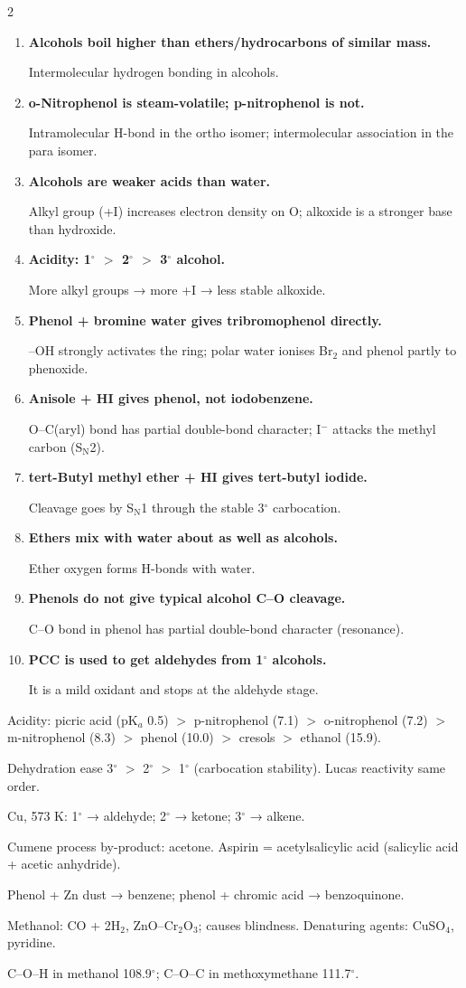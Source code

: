 \documentclass[10pt,a4paper]{extarticle}
\newenvironment{rqlist}{\begin{enumerate}[leftmargin=12pt,label={\sffamily\bfseries\scriptsize\color{uc}\arabic*.},itemsep=1pt]}{\end{enumerate}}
\newcommand{\ans}{\par\hspace*{2pt}{\color{uc}$\hookrightarrow$}\;}
\begin{document}
\begin{multicols}{2}
\begin{rqlist}
\item \textbf{Alcohols boil higher than ethers/hydrocarbons of similar mass.}\ans Intermolecular hydrogen bonding in alcohols.
\item \textbf{o-Nitrophenol is steam-volatile; p-nitrophenol is not.}\ans Intramolecular H-bond in the ortho isomer; intermolecular association in the para isomer.
\item \textbf{Alcohols are weaker acids than water.}\ans Alkyl group (+I) increases electron density on O; alkoxide is a stronger base than hydroxide.
\item \textbf{Acidity: 1$^\circ$ $>$ 2$^\circ$ $>$ 3$^\circ$ alcohol.}\ans More alkyl groups → more +I → less stable alkoxide.
\item \textbf{Phenol + bromine water gives tribromophenol directly.}\ans --OH strongly activates the ring; polar water ionises Br$_2$ and phenol partly to phenoxide.
\item \textbf{Anisole + HI gives phenol, not iodobenzene.}\ans O--C(aryl) bond has partial double-bond character; I$^-$ attacks the methyl carbon (S$_\text{N}$2).
\item \textbf{tert-Butyl methyl ether + HI gives tert-butyl iodide.}\ans Cleavage goes by S$_\text{N}$1 through the stable 3$^\circ$ carbocation.
\item \textbf{Ethers mix with water about as well as alcohols.}\ans Ether oxygen forms H-bonds with water.
\item \textbf{Phenols do not give typical alcohol C--O cleavage.}\ans C--O bond in phenol has partial double-bond character (resonance).
\item \textbf{PCC is used to get aldehydes from 1$^\circ$ alcohols.}\ans It is a mild oxidant and stops at the aldehyde stage.
\end{rqlist}

\begin{fl}
\item Acidity: picric acid (pK$_a$ 0.5) $>$ p-nitrophenol (7.1) $>$ o-nitrophenol (7.2) $>$ m-nitrophenol (8.3) $>$ phenol (10.0) $>$ cresols $>$ ethanol (15.9).
\item Dehydration ease 3$^\circ$ $>$ 2$^\circ$ $>$ 1$^\circ$ (carbocation stability). Lucas reactivity same order.
\item Cu, 573 K: 1$^\circ$ → aldehyde; 2$^\circ$ → ketone; 3$^\circ$ → alkene.
\item Cumene process by-product: acetone. Aspirin = acetylsalicylic acid (salicylic acid + acetic anhydride).
\item Phenol + Zn dust → benzene; phenol + chromic acid → benzoquinone.
\item Methanol: CO + 2H$_2$, ZnO--Cr$_2$O$_3$; causes blindness. Denaturing agents: CuSO$_4$, pyridine.
\item C--O--H in methanol 108.9$^\circ$; C--O--C in methoxymethane 111.7$^\circ$.
\end{fl}


\end{multicols}
\end{document}
